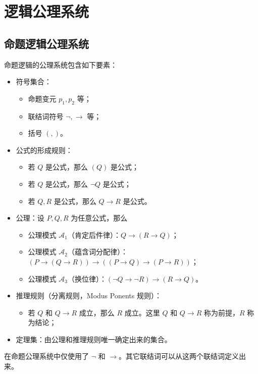 \section{逻辑公理系统}

\subsection{命题逻辑公理系统}

命题逻辑的公理系统包含如下要素：

\begin{itemize}
	\item 符号集合：
	\begin{itemize}
		\item 命题变元 $p_1, p_2$ 等；
		\item 联结词符号 $\lnot, \to$ 等；
		\item 括号 $(, )$。
	\end{itemize}
	\item 公式的形成规则：
	\begin{itemize}
		\item 若 $Q$ 是公式，那么 $(Q)$ 是公式；
		\item 若 $Q$ 是公式，那么 $\lnot Q$ 是公式；
		\item 若 $Q, R$ 是公式，那么 $Q \to R$ 是公式。
	\end{itemize}
	\item 公理：设 $P, Q, R$ 为任意公式，那么
	\begin{itemize}
		\item 公理模式 $\mathscr{A}_1$（肯定后件律）：$Q \to (R \to Q)$；
		\item 公理模式 $\mathscr{A}_2$（蕴含词分配律）：$(P \to (Q \to R)) \to ((P \to Q) \to (P \to R))$；
		\item 公理模式 $\mathscr{A}_3$（换位律）：$(\lnot Q \to \lnot R) \to (R \to Q)$。
	\end{itemize}
	\item 推理规则（分离规则，Modus Ponents 规则）：
	\begin{itemize}
		\item 若 $Q$ 和 $Q \to R$ 成立，那么 $R$ 成立。这里 $Q$ 和 $Q \to R$ 称为前提，$R$ 称为结论；
	\end{itemize}
	\item 定理集：由公理和推理规则唯一确定出来的集合。
\end{itemize}

在命题公理系统中仅使用了 $\lnot$ 和 $\to$。其它联结词可以从这两个联结词定义出来。